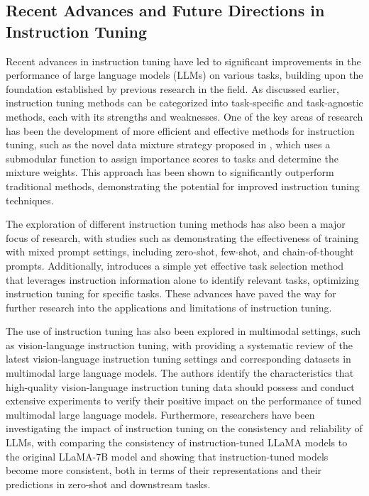 \documentclass[11pt]{article}
\begin{document}
\subsection{Recent Advances and Future Directions in Instruction Tuning}

Recent advances in instruction tuning have led to significant improvements in the performance of large language models (LLMs) on various tasks, building upon the foundation established by previous research in the field. As discussed earlier, instruction tuning methods can be categorized into task-specific and task-agnostic methods, each with its strengths and weaknesses. One of the key areas of research has been the development of more efficient and effective methods for instruction tuning, such as the novel data mixture strategy proposed in \cite{ref35}, which uses a submodular function to assign importance scores to tasks and determine the mixture weights. This approach has been shown to significantly outperform traditional methods, demonstrating the potential for improved instruction tuning techniques.

The exploration of different instruction tuning methods has also been a major focus of research, with studies such as \cite{ref12} demonstrating the effectiveness of training with mixed prompt settings, including zero-shot, few-shot, and chain-of-thought prompts. Additionally, \cite{ref24} introduces a simple yet effective task selection method that leverages instruction information alone to identify relevant tasks, optimizing instruction tuning for specific tasks. These advances have paved the way for further research into the applications and limitations of instruction tuning.

The use of instruction tuning has also been explored in multimodal settings, such as vision-language instruction tuning, with \cite{ref11} providing a systematic review of the latest vision-language instruction tuning settings and corresponding datasets in multimodal large language models. The authors identify the characteristics that high-quality vision-language instruction tuning data should possess and conduct extensive experiments to verify their positive impact on the performance of tuned multimodal large language models. Furthermore, researchers have been investigating the impact of instruction tuning on the consistency and reliability of LLMs, with \cite{ref33} comparing the consistency of instruction-tuned LLaMA models to the original LLaMA-7B model and showing that instruction-tuned models become more consistent, both in terms of their representations and their predictions in zero-shot and downstream tasks.
\end{document}
